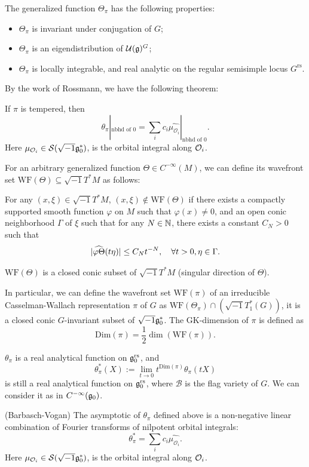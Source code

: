 The generalized function $\Theta_{\pi}$ has the following properties:
\begin{itemize}
    \item $\Theta_{\pi}$ is invariant under conjugation of $G$;
    \item $\Theta_{\pi}$ is an eigendistribution of $\mathcal{U}(\mathfrak{g})^{G}$;
    \item $\Theta_{\pi}$ is locally integrable, and real analytic on the regular semisimple locus $G^{\mathrm{rs}}$.
\end{itemize}

By the work of Rossmann, we have the following theorem:
\begin{thm}
    If $\pi$ is tempered, then
    \[
        \theta_{\pi}|_{\textrm{nbhd of 0}} = \sum_{i} c_i \widehat{\mu_{\mathcal{O}_i}}|_{\textrm{nbhd of 0}}.
    \]
    Here $\mu_{\mathcal{O}_i} \in \mathcal{S}(\sqrt{-1}\mathfrak{g}_0^*)$, is the orbital integral along $\mathcal{O}_i$.
\end{thm}

For an arbitrary generalized function $\Theta \in C^{-\infty}(M)$, we can define its wavefront set $\mathrm{WF}(\Theta) \subseteq \sqrt{-1}T^*M$ as follows:
\begin{defn}
    For any $(x,\xi) \in \sqrt{-1}T^*M$, $(x,\xi) \notin \mathrm{WF}(\Theta)$ if there exists a compactly supported smooth function $\varphi$ on $M$ such that $\varphi(x) \neq 0$, and an open conic neighborhood $\Gamma$ of $\xi$ such that for any $N \in \mathbb{N}$, there exists a constant $C_N > 0$ such that
    \[\lvert\widehat{\varphi \Theta}(t\eta)\rvert \leq C_N t^{-N}, \quad \forall t > 0, \eta \in \Gamma.\]
\end{defn}
$\mathrm{WF}(\Theta)$ is a closed conic subset of $\sqrt{-1}T^*M$ (singular direction of $\Theta$).

In particular, we can define the wavefront set $\mathrm{WF}(\pi)$ of an irreducible Casselman-Wallach representation $\pi$ of $G$ as $\mathrm{WF}(\Theta_{\pi}) \cap (\sqrt{-1}T^*_1(G))$, it is a closed conic $G$-invariant subset of $\sqrt{-1}\mathfrak{g}_0^*$. The GK-dimension of $\pi$ is defined as
\[\mathrm{Dim}(\pi) = \frac{1}{2}\dim(\mathrm{WF}(\pi)).\]

$\theta_{\pi}$ is a real analytical function on $\mathfrak{g}_0^{\mathrm{rs}}$, and
\[ \theta^{*}_{\pi}(X) :=  \lim_{t \to 0}t^{\mathrm{Dim}(\pi)}\theta_{\pi}(tX)\]
is still a real analytical function on $\mathfrak{g}_0^{\mathrm{rs}}$, where $\mathcal{B}$ is the flag variety of $G$. We can consider it as in $C^{-\infty}(\mathfrak{g}_0)$.

\begin{thm}(Barbasch-Vogan)
     The asymptotic of $\theta_{\pi}$ defined above is a non-negative linear combination of Fourier transforms of nilpotent orbital integrals:
      \[
          \theta^*_{\pi} = \sum_{i} c_i \widehat{\mu_{\mathcal{O}_i}}.
      \]
      Here $\mu_{\mathcal{O}_i} \in \mathcal{S}(\sqrt{-1}\mathfrak{g}_0^*)$, is the orbital integral along $\mathcal{O}_i$.
\end{thm}

